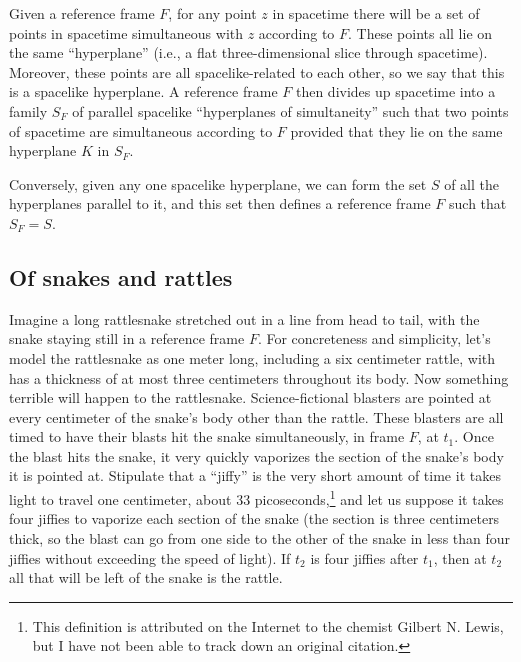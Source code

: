 Given a reference frame $F$, for any point $z$ in spacetime there will be a set of points in spacetime simultaneous 
with $z$ according to $F$. These points all lie on the same ``hyperplane'' (i.e., a flat three-dimensional slice 
through spacetime). Moreover, these points are all spacelike-related to each other, so we say that this is a 
spacelike hyperplane. A reference frame $F$ then divides up spacetime into a family $S_F$ of parallel spacelike 
``hyperplanes of simultaneity'' such that two points of spacetime are simultaneous according to $F$ provided that they lie on the 
same hyperplane $K$ in $S_F$. 

Conversely, given any one spacelike hyperplane, we can form the set $S$ of all the hyperplanes parallel to it, and this 
set then defines a reference frame $F$ such that $S_F=S$.

\subsection{Of snakes and rattles}
Imagine a long rattlesnake stretched out in a line from head to tail, with the snake staying still in a reference frame $F$. For concreteness and 
simplicity, let's model the rattlesnake as one meter long, including a six centimeter rattle, with has a thickness of at 
most three centimeters throughout its body. Now something terrible will happen to the rattlesnake. Science-fictional blasters 
are pointed at every centimeter of the  snake's body other than the rattle. These blasters are all timed to have their blasts 
hit the snake simultaneously, in frame $F$, at $t_1$. Once the blast hits the snake, it very quickly vaporizes the section 
of the snake's body it is pointed at. Stipulate that a ``jiffy'' is the very short amount of time it takes light to travel one 
centimeter, about 33 picoseconds,\footnote{This definition is attributed on the Internet to the chemist Gilbert N. Lewis, but 
I have not been able to track 
down an original citation.} and let us suppose it takes four jiffies to vaporize each section of the snake (the section 
is three centimeters thick, so the blast can go from one side to the other of the snake in less than four jiffies without exceeding the 
speed of light). If $t_2$ is four jiffies after $t_1$, then at $t_2$ all that will be left of the snake is the rattle. 

